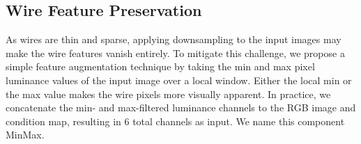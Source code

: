 \subsection{Wire Feature Preservation}
\label{sec:wire_feature_preserve}
As wires are thin and sparse, applying downsampling to the input images may make the wire features vanish entirely. To mitigate this challenge, we propose a simple feature augmentation technique by taking the min and max pixel luminance values of the input image over a local window. Either the local min or the max value makes the wire pixels more visually apparent. In practice, we concatenate the min- and max-filtered luminance channels to the RGB image and condition map, resulting in 6 total channels as input. We name this component MinMax.



